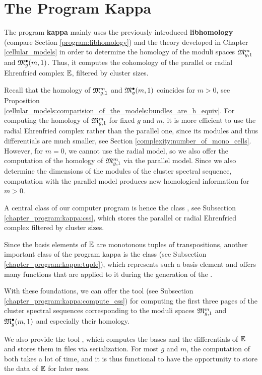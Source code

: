 \section{The Program Kappa}
\label{chapter_program:kappa}

The program {\bf kappa} mainly uses the previously introduced {\bf libhomology} (compare Section \ref{program:libhomology}) 
and the theory developed in Chapter \ref{cellular_models}
in order to determine the homology of the moduli spaces $\Modspc[1]$ and $\ModspcRad[1]$. 
Thus, it computes the cohomology of the parallel or radial Ehrenfried complex $\Ehrprog$,
filtered by cluster sizes.

Recall that the homology of $\Modspc[1]$ and $\ModspcRad[1]$ coincides for $m > 0$, see Proposition \ref{cellular_models:comparision_of_the_models:bundles_are_h_equiv}.
For computing the homology of $\Modspc[1]$ for fixed $g$ and $m$, 
it is more efficient to use the radial Ehrenfried complex rather than the parallel one, 
since its modules and thus differentials are much smaller, see Section \ref{complexity:number_of_mono_cells}.
However, for $m = 0$, we cannot use the radial model, so we also offer the computation of the homology of $\Modspc[1]$ via the parallel model.
Since we also determine the dimensions of the modules of the cluster spectral sequence, 
computation with the parallel model produces new homological information for $m > 0$.

A central class of our computer program is hence the class , see Subsection \ref{chapter_program:kappa:css},
which stores the parallel or radial Ehrenfried complex filtered by cluster sizes.

Since the basis elements of $\Ehrprog$ are monotonous tuples of transpositions,
another important class of the program kappa is the class  (see Subsection \ref{chapter_program:kappa:tuple}),
which represents such a basis element and offers many functions that are applied to it
during the generation of the .

With these foundations, we can offer the tool  (see Subsection \ref{chapter_program:kappa:compute_css}) 
for computing the first three pages of the cluster spectral sequences corresponding to the moduli spaces $\Modspc[1]$ and $\ModspcRad[1]$
and especially their homology.

We also provide the tool ,
which computes the bases and the differentials of $\Ehrprog$ and stores them in files via serialization.
For most $g$ and $m$, 
the computation of both takes a lot of time,
and it is thus functional to have the opportunity to store the data of $\Ehrprog$ for later uses.

